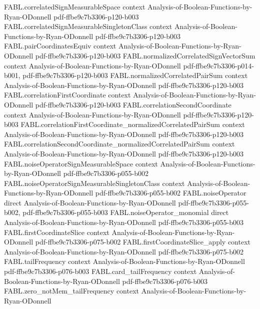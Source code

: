 \begin{theorem}
  {FABL.correlatedSignMeasurableSpace}
  {context}
  {Analysis-of-Boolean-Functions-by-Ryan-ODonnell}
  {pdf-ffbe9c7b3306-p120-b003}
\proofstep
  {FABL.correlatedSignMeasurableSingletonClass}
  {context}
  {Analysis-of-Boolean-Functions-by-Ryan-ODonnell}
  {pdf-ffbe9c7b3306-p120-b003}
\proofstep
  {FABL.pairCoordinatesEquiv}
  {context}
  {Analysis-of-Boolean-Functions-by-Ryan-ODonnell}
  {pdf-ffbe9c7b3306-p120-b003}
\proofstep
  {FABL.normalizedCorrelatedSignVectorSum}
  {context}
  {Analysis-of-Boolean-Functions-by-Ryan-ODonnell}
  {pdf-ffbe9c7b3306-p014-b001,
    pdf-ffbe9c7b3306-p120-b003}
\proofstep
  {FABL.normalizedCorrelatedPairSum}
  {context}
  {Analysis-of-Boolean-Functions-by-Ryan-ODonnell}
  {pdf-ffbe9c7b3306-p120-b003}
\proofstep
  {FABL.correlationFirstCoordinate}
  {context}
  {Analysis-of-Boolean-Functions-by-Ryan-ODonnell}
  {pdf-ffbe9c7b3306-p120-b003}
\proofstep
  {FABL.correlationSecondCoordinate}
  {context}
  {Analysis-of-Boolean-Functions-by-Ryan-ODonnell}
  {pdf-ffbe9c7b3306-p120-b003}
\proofstep
  {FABL.correlationFirstCoordinate_normalizedCorrelatedPairSum}
  {context}
  {Analysis-of-Boolean-Functions-by-Ryan-ODonnell}
  {pdf-ffbe9c7b3306-p120-b003}
\proofstep
  {FABL.correlationSecondCoordinate_normalizedCorrelatedPairSum}
  {context}
  {Analysis-of-Boolean-Functions-by-Ryan-ODonnell}
  {pdf-ffbe9c7b3306-p120-b003}
\proofstep
  {FABL.noiseOperatorSignMeasurableSpace}
  {context}
  {Analysis-of-Boolean-Functions-by-Ryan-ODonnell}
  {pdf-ffbe9c7b3306-p055-b002}
\proofstep
  {FABL.noiseOperatorSignMeasurableSingletonClass}
  {context}
  {Analysis-of-Boolean-Functions-by-Ryan-ODonnell}
  {pdf-ffbe9c7b3306-p055-b002}
\proofstep
  {FABL.noiseOperator}
  {direct}
  {Analysis-of-Boolean-Functions-by-Ryan-ODonnell}
  {pdf-ffbe9c7b3306-p055-b002,
    pdf-ffbe9c7b3306-p055-b003}
\proofstep
  {FABL.noiseOperator_monomial}
  {direct}
  {Analysis-of-Boolean-Functions-by-Ryan-ODonnell}
  {pdf-ffbe9c7b3306-p055-b003}
\proofstep
  {FABL.firstCoordinateSlice}
  {context}
  {Analysis-of-Boolean-Functions-by-Ryan-ODonnell}
  {pdf-ffbe9c7b3306-p075-b002}
\proofstep
  {FABL.firstCoordinateSlice_apply}
  {context}
  {Analysis-of-Boolean-Functions-by-Ryan-ODonnell}
  {pdf-ffbe9c7b3306-p075-b002}
\proofstep
  {FABL.tailFrequency}
  {context}
  {Analysis-of-Boolean-Functions-by-Ryan-ODonnell}
  {pdf-ffbe9c7b3306-p076-b003}
\proofstep
  {FABL.card_tailFrequency}
  {context}
  {Analysis-of-Boolean-Functions-by-Ryan-ODonnell}
  {pdf-ffbe9c7b3306-p076-b003}
\proofstep
  {FABL.zero_notMem_tailFrequency}
  {context}
  {Analysis-of-Boolean-Functions-by-Ryan-ODonnell}

\end{theorem}
